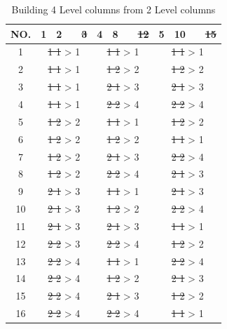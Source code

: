 \begin{table}[ht]
	\centering
	\begin{tabular}{ |c||cccc|cccc|cccc|  }
		\hline
		NO.& 1 & 2 & & \sout{3} & 4 & 8 & &  \sout{12} & 5 & 10 & &  \sout{15}\\
		\hline
		1  & \multicolumn{4}{c}{\sout{1 1} > 1 } & \multicolumn{4}{|c|}{\sout{1 1} > 1 } & \multicolumn{4}{c|}{\sout{1 1} > 1 }\\
		2  & \multicolumn{4}{c}{\sout{1 1} > 1 } & \multicolumn{4}{|c|}{\sout{1 2} > 2 } & \multicolumn{4}{c|}{\sout{1 2} > 2 }\\
		3  & \multicolumn{4}{c}{\sout{1 1} > 1 } & \multicolumn{4}{|c|}{\sout{2 1} > 3 } & \multicolumn{4}{c|}{\sout{2 1} > 3 }\\
		4  & \multicolumn{4}{c}{\sout{1 1} > 1 } & \multicolumn{4}{|c|}{\sout{2 2} > 4 } & \multicolumn{4}{c|}{\sout{2 2} > 4 }\\
		5  & \multicolumn{4}{c}{\sout{1 2} > 2 } & \multicolumn{4}{|c|}{\sout{1 1} > 1 } & \multicolumn{4}{c|}{\sout{1 2} > 2 }\\
		6  & \multicolumn{4}{c}{\sout{1 2} > 2 } & \multicolumn{4}{|c|}{\sout{1 2} > 2 } & \multicolumn{4}{c|}{\sout{1 1} > 1 }\\
		7  & \multicolumn{4}{c}{\sout{1 2} > 2 } & \multicolumn{4}{|c|}{\sout{2 1} > 3 } & \multicolumn{4}{c|}{\sout{2 2} > 4 }\\
		8  & \multicolumn{4}{c}{\sout{1 2} > 2 } & \multicolumn{4}{|c|}{\sout{2 2} > 4 } & \multicolumn{4}{c|}{\sout{2 1} > 3 }\\
		9  & \multicolumn{4}{c}{\sout{2 1} > 3 } & \multicolumn{4}{|c|}{\sout{1 1} > 1 } & \multicolumn{4}{c|}{\sout{2 1} > 3 }\\
		10 & \multicolumn{4}{c}{\sout{2 1} > 3 } & \multicolumn{4}{|c|}{\sout{1 2} > 2 } & \multicolumn{4}{c|}{\sout{2 2} > 4 }\\
		11 & \multicolumn{4}{c}{\sout{2 1} > 3 } & \multicolumn{4}{|c|}{\sout{2 1} > 3 } & \multicolumn{4}{c|}{\sout{1 1} > 1 }\\
		12 & \multicolumn{4}{c}{\sout{2 2} > 3 } & \multicolumn{4}{|c|}{\sout{2 2} > 4 } & \multicolumn{4}{c|}{\sout{1 2} > 2 }\\
		13 & \multicolumn{4}{c}{\sout{2 2} > 4 } & \multicolumn{4}{|c|}{\sout{1 1} > 1 } & \multicolumn{4}{c|}{\sout{2 2} > 4 }\\
		14 & \multicolumn{4}{c}{\sout{2 2} > 4 } & \multicolumn{4}{|c|}{\sout{1 2} > 2 } & \multicolumn{4}{c|}{\sout{2 1} > 3 }\\
		15 & \multicolumn{4}{c}{\sout{2 2} > 4 } & \multicolumn{4}{|c|}{\sout{2 1} > 3 } & \multicolumn{4}{c|}{\sout{1 2} > 2 }\\
		16 & \multicolumn{4}{c}{\sout{2 2} > 4 } & \multicolumn{4}{|c|}{\sout{2 2} > 4 } & \multicolumn{4}{c|}{\sout{1 1} > 1 }\\
		\hline
	\end{tabular}
	\caption{Building 4 Level columns from 2 Level columns}
	\label{tab:hyperparameter_tuning:merging_columns}
\end{table}

